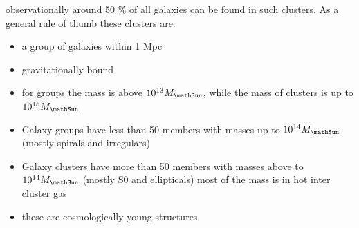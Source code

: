 \documentclass[11pt,a4paper]{article}
\begin{document}
observationally around 50 \% of all galaxies can be found in such clusters.
As a general rule of thumb these clusters are: 
\begin{itemize}
    \item a group of galaxies within 1 Mpc
    \item gravitationally bound
    \item for groups the mass is above $10^{13} M_\mathSun$, while the mass of clusters is up to $10^{15} M_\mathSun$
    \item Galaxy groups have less than 50 members with masses up to $10^{14} M_\mathSun$ (mostly spirals and irregulars)
    \item Galaxy clusters have more than 50 members with masses above to $10^{14} M_\mathSun$ (mostly S0 and ellipticals) most of the mass is in hot inter cluster gas
    \item these are cosmologically young structures
\end{itemize}
\end{document}
